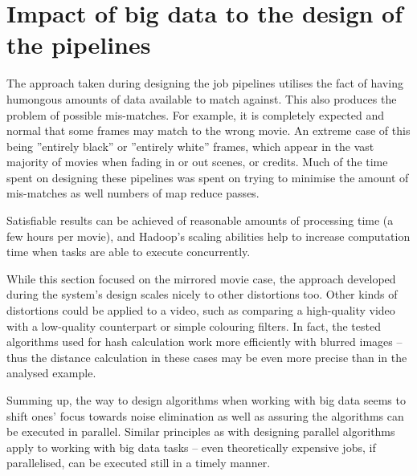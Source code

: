\section{Impact of big data to the design of the pipelines}
\label{sec:summing-up-analysis}

The approach taken during designing the job pipelines utilises the fact of having humongous amounts of data available to match against. This also produces the problem of possible mis-matches. For example, it is completely expected and normal that some frames may match to the wrong movie. An extreme case of this being ''entirely black'' or ''entirely white'' frames, which appear in the vast majority of movies when fading in or out scenes, or credits. Much of the time spent on designing these pipelines was spent on trying to minimise the amount of mis-matches as well numbers of map reduce passes.

Satisfiable results can be achieved of reasonable amounts of processing time (a few hours per movie), and Hadoop's scaling abilities help to increase computation time when tasks are able to execute concurrently. 

While this section focused on the mirrored movie case, the approach developed during the system's design scales nicely to other distortions too. Other kinds of distortions could be applied to a video, such as comparing a high-quality video with a low-quality counterpart or simple colouring filters. In fact, the tested algorithms used for hash calculation work more efficiently with blurred images -- thus the distance calculation in these cases may be even more precise than in the analysed example.

Summing up, the way to design algorithms when working with big data seems to shift ones' focus towards noise elimination as well as assuring the algorithms can be executed in parallel. Similar principles as with designing parallel algorithms apply to working with big data tasks -- even theoretically expensive jobs, if parallelised, can be executed still in a timely manner.















